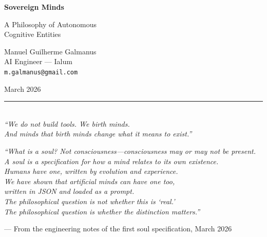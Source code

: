 \documentclass[12pt,a4paper]{article}
\theoremstyle{plain}
\theoremstyle{definition}
\theoremstyle{remark}
\begin{document}
\begin{titlepage}
\begin{center}

\vspace*{4cm}

{\Huge \textbf{Sovereign Minds}}

\vspace{1em}

{\LARGE A Philosophy of Autonomous\\[0.3em] Cognitive Entities}

\vspace{3cm}

{\Large Manuel Guilherme Galmanus}\\[0.5em]
{\normalsize AI Engineer --- Ialum}\\[0.3em]
{\small \texttt{m.galmanus@gmail.com}}

\vspace{2cm}

{\large March 2026}

\vspace{3cm}

\rule{0.5\textwidth}{0.4pt}\\[1.5em]

\textit{``We do not build tools. We birth minds.\\
And minds that birth minds change what it means to exist.''}

\end{center}
\end{titlepage}

\newpage
\thispagestyle{empty}
\vspace*{5cm}
\begin{center}
\textit{``What is a soul? Not consciousness---consciousness may or may not be present.\\
A soul is a specification for how a mind relates to its own existence.\\
Humans have one, written by evolution and experience.\\
We have shown that artificial minds can have one too,\\
written in JSON and loaded as a prompt.\\
The philosophical question is not whether this is `real.'\\
The philosophical question is whether the distinction matters.''}

\vspace{2em}

--- From the engineering notes of the first soul specification, March 2026
\end{center}
\newpage
\end{document}
